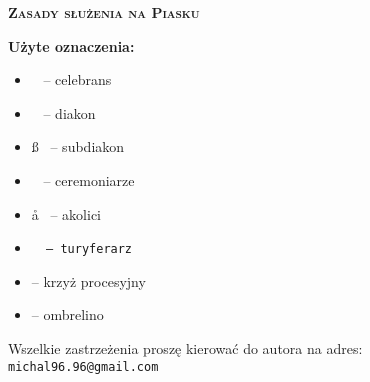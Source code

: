 \begin{center}
	\vspace*{2cm}

 	\hrulefill
	
	\vspace{0.7cm}
	
	\textbf{\textsc{{\Huge{Zasady służenia na Piasku}}\\}}
	
	\vspace{0.5cm}
	
	\hrulefill

	\vspace{\fill}	

	 {\large \textbf{Użyte oznaczenia:}} \\
	
	 \vspace{0.1\textwidth}
	 
	 {\large\centering
	   \begin{itemize}[leftmargin=.43\linewidth,rightmargin=.35\linewidth,label=]
	    \item \ii~ -- celebrans 
	    \item \dd~ -- diakon 
	    \item \ss~ -- subdiakon
 	    \item \cc~ -- ceremoniarze 
	    \item \aa~ -- akolici 
	    \item \tt~ -- turyferarz 
	    \item {} -- krzyż procesyjny
	    \item \oo -- ombrelino
	  \end{itemize}
	 }
	
	\vspace{5cm}	
	
	\hrulefill
	
	{\footnotesize 	Wszelkie zastrzeżenia proszę kierować do autora na adres: \texttt{michal96.96@gmail.com}}
\end{center}

	